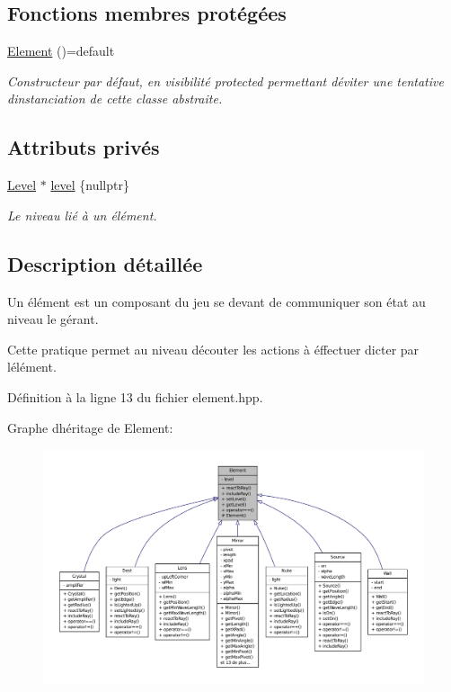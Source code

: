 \subsection*{Fonctions membres protégées}
\begin{DoxyCompactItemize}
\item 
\hyperlink{classElement_a084081001b0f14ae12d612c866df861c}{Element} ()=default
\begin{DoxyCompactList}\small\item\em Constructeur par défaut, en visibilité protected permettant d\textquotesingle{}éviter une tentative d\textquotesingle{}instanciation de cette classe abstraite. \end{DoxyCompactList}\end{DoxyCompactItemize}
\subsection*{Attributs privés}
\begin{DoxyCompactItemize}
\item 
\hyperlink{classLevel}{Level} $\ast$ \hyperlink{classElement_a28c0ab6e211fb16fc2957024ca2761cb}{level} \{nullptr\}
\begin{DoxyCompactList}\small\item\em Le niveau lié à un élément. \end{DoxyCompactList}\end{DoxyCompactItemize}


\subsection{Description détaillée}
Un élément est un composant du jeu se devant de communiquer son état au niveau le gérant. 

Cette pratique permet au niveau d\textquotesingle{}écouter les actions à éffectuer dicter par l\textquotesingle{}élément. 

Définition à la ligne 13 du fichier element.\+hpp.



Graphe d\textquotesingle{}héritage de Element\+:\nopagebreak
\begin{figure}[H]
\begin{center}
\leavevmode
\includegraphics[width=350pt]{d8/dd6/classElement__inherit__graph}
\end{center}
\end{figure}



